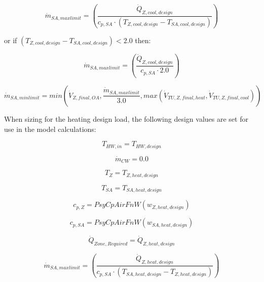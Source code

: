 \begin{equation}
  {\dot m_{SA,max limit}} = { \left(\frac{{\dot Q_{Z,cool,design } }}{{c_{p,SA}} \cdot {( {T_{Z,cool,design } } - {T_{SA,cool,design } } )}}  \right) }
\end{equation}

or if \(({T_{Z,cool,design }} - {T_{SA,cool,design}}) < 2.0\) then:

\begin{equation}
  {\dot m_{SA,max limit}} = { \left(\frac{{\dot Q_{Z,cool,design } }}{{c_{p,SA}} \cdot 2.0 } \right) }
\end{equation}

\begin{equation}
  {\dot m_{SA,min limit}} = min( {\dot V_{Z,final,OA} }, \frac{{\dot m_{SA,max limit}}}{3.0}, max({\dot V_{TU,Z,final,heat} } , {\dot V_{TU,Z,final,cool} }) )
\end{equation}

When sizing for the heating design load, the following design values are set for use in the model calculations:

\begin{equation}
  {T_{HW,in}} = {T_{HW,design}}
\end{equation}

\begin{equation}
  {\dot m_{CW}} = {0.0}
\end{equation}

\begin{equation}
  {T_{Z}} = {T_{Z,heat,design } }
\end{equation}

\begin{equation}
  {T_{SA}} = {T_{SA,heat,design}}
\end{equation}

\begin{equation}
  {c_{p,Z}} = {PsyCpAirFnW({w_{Z,heat,design } }) }
\end{equation}

\begin{equation}
  {c_{p,SA}} = {PsyCpAirFnW ( {w_{SA,heat,design } }) }
\end{equation}

\begin{equation}
  {\dot Q_{Zone, Required}} = {\dot Q_{Z,heat,design } }
\end{equation}

\begin{equation}
  {\dot m_{SA,max limit}} = { \left(\frac{{\dot Q_{Z,heat,design } }}{{c_{p,SA}} \cdot ( {T_{SA,heat,design } } - {T_{Z,heat,design }} ) } \right) }
\end{equation}

